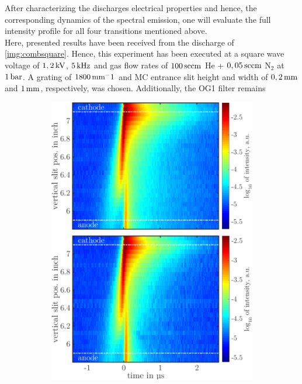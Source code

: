 \documentclass[a4paper,10pt,twoside]{article}
\begin{document}
\begin{multicols*}{2}
		After characterizing the discharges electrical properties and hence, the corresponding dynamics of the spectral emission, one will evaluate the full intensity profile for all four transitions mentioned above.\\
		Here, presented results have been received from the discharge of \autoref{img:combsquare}. Hence, this experiment has been executed at a square wave voltage of $\unit[1,2]{kV}$, $\unit[5]{kHz}$ and gas flow rates of $\unit[100]{sccm}$ He + $\unit[0,05]{sccm}$ N$_2$ at $\unit[1]{bar}$. A grating of $\unit[1800]{mm^-1}$ and MC entrance slit height and width of $\unit[0,2]{mm}$ and $\unit[1]{mm}$, respectively, was chosen. Additionally, the OG1 filter remains
			
	\end{multicols*}
	
			\begin{figure}
				\centering
				\begin{subfigure}[t]{0.49\textwidth}
					\includegraphics[width=\textwidth]{figures/lineratio/combinations/korr667over728.pdf}

\end{subfigure}
\end{figure}
\end{document}
